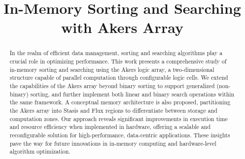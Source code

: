 \documentclass[conference]{IEEEtran}
\begin{document}
\title{\textbf{In-Memory Sorting and Searching with Akers Array}\\
}

\author{
\and
{}
\and
{}
\and
{}
}

\maketitle

\begin{abstract}
In the realm of efficient data management, sorting and searching algorithms play a crucial role in optimizing performance. This work presents a comprehensive study of in-memory sorting and searching using the Akers logic array, a two-dimensional structure capable of parallel computation through configurable logic cells. We extend the capabilities of the Akers array beyond binary sorting to support generalized (non-binary) sorting, and further implement both linear and binary search operations within the same framework. A conceptual memory architecture is also proposed, partitioning the Akers array into Stasis and Flux regions to differentiate between storage and computation zones. Our approach reveals significant improvements in execution time and resource efficiency when implemented in hardware, offering a scalable and reconfigurable solution for high-performance, data-centric applications. These insights pave the way for future innovations in in-memory computing and hardware-level algorithm optimization.


\end{abstract}
\end{document}
